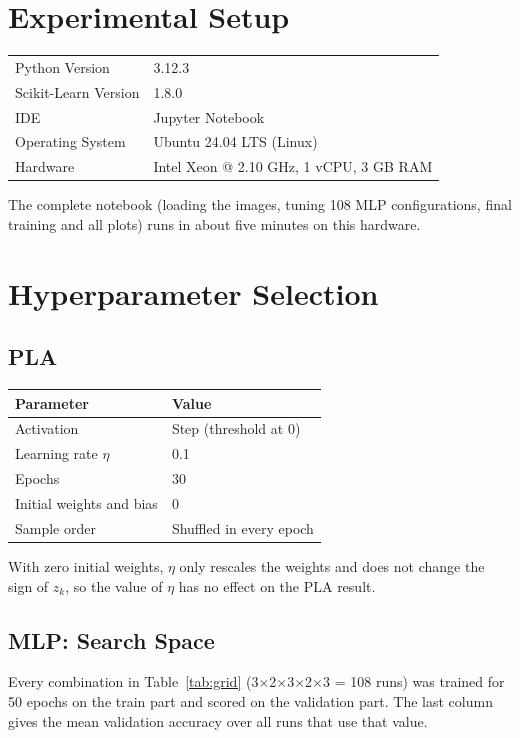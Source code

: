 \documentclass[12pt,a4paper]{article}
\begin{document}
\section{Experimental Setup}
\begin{table}[H]
\centering
\begin{tabular}{ll}
\toprule
Python Version & 3.12.3 \\
Scikit-Learn Version & 1.8.0 \cite{sklearn} \\
IDE & Jupyter Notebook \\
Operating System & Ubuntu 24.04 LTS (Linux) \\
Hardware & Intel Xeon @ 2.10 GHz, 1 vCPU, 3 GB RAM \\
\bottomrule
\end{tabular}
\end{table}
The complete notebook (loading the images, tuning 108 MLP configurations, final training and all plots) runs in about five minutes on this hardware.

\section{Hyperparameter Selection}

\subsection{PLA}
\begin{table}[H]
\centering
\begin{tabular}{ll}
\toprule
Parameter & Value\\
\midrule
Activation & Step (threshold at 0) \\
Learning rate $\eta$ & 0.1 \\
Epochs & 30 \\
Initial weights and bias & 0 \\
Sample order & Shuffled in every epoch \\
\bottomrule
\end{tabular}
\end{table}
With zero initial weights, $\eta$ only rescales the weights and does not change the sign of $z_k$, so the value of $\eta$ has no effect on the PLA result.

\subsection{MLP: Search Space}
Every combination in Table~\ref*{tab:grid} (3$\times$2$\times$3$\times$2$\times$3 = 108 runs) was trained for 50 epochs on the train part and scored on the validation part. The last column gives the mean validation accuracy over all runs that use that value.
\end{document}

